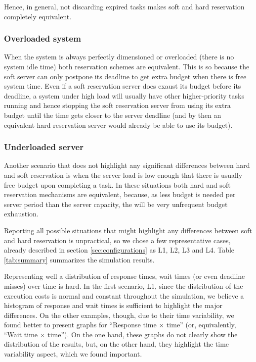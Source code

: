 \documentclass[times, 10pt,twocolumn]{article}
\begin{document}
Hence, in general, not discarding expired tasks makes soft and hard
reservation completely equivalent. 

\subsubsection{Overloaded system}
\label{sec:system-load}

When the system is always perfectly dimensioned or overloaded (there
is no system idle time) both reservation schemes are equivalent. This
is so because the soft server can only postpone its deadline to get
extra budget when there is free system time. Even if a soft
reservation server does exaust its budget before its deadline, a
system under high load will usually have other higher-priority tasks
running and hence stopping the soft reservation server from using its
extra budget until the time gets closer to the server deadline (and by
then an equivalent hard reservation server would already be able to
use its budget).

\subsubsection{Underloaded server}
\label{sec:server-load}

Another scenario that does not highlight any significant differences
between hard and soft reservation is when the server load is low
enough that there is usually free budget upon completing a task. In
these situations both hard and soft reservation mechanisms are
equivalent, because, as less budget is needed per server period than
the server capacity, the will be very unfrequent budget
exhaustion.

\label{sec:indiv-simul-results}

Reporting all possible situations that might highlight any differences
between soft and hard reservation is unpractical, so we chose a few
representative cases, already described in section
\ref{sec:configurations} as L1, L2, L3 and L4. Table \ref{tab:summary}
summarizes the simulation results.

Representing well a distribution of response times, wait times (or
even deadline misses) over time is hard. In the first scenario, L1,
since the distribution of the execution costs is normal and constant
throughout the simulation, we believe a histogram of response and
wait times is sufficient to highlight the major differences. On the
other examples, though, due to their time variability, we found better
to present graphs for ``Response time $\times$ time'' (or, equivalently,
``Wait time $\times$ time''). On the one hand, these graphs do not
clearly show the distribution of the results, but, on the other hand,
they highlight the time variability aspect, which we found important.
\end{document}
